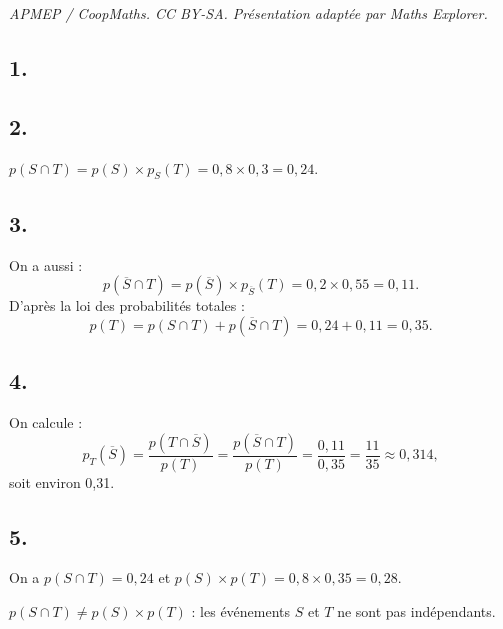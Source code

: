 \documentclass[10pt]{article}
\begin{document}
\noindent\textit{APMEP / CoopMaths. CC BY-SA. Présentation adaptée par Maths Explorer.}\par\medskip
\subsection*{1.}

\begin{center}
\end{center}

\subsection*{2.}

\(p(S \cap T) = p(S) \times p_S(T) = 0{,}8 \times 0{,}3 = 0{,}24\).

\subsection*{3.}

On a aussi :
\[
p(\overline{S} \cap T) = p(\overline{S}) \times p_{\overline{S}}(T) = 0{,}2 \times 0{,}55 = 0{,}11.
\]
D'après la loi des probabilités totales :
\[
p(T) = p(S \cap T) + p(\overline{S} \cap T) = 0{,}24 + 0{,}11 = 0{,}35.
\]

\subsection*{4.}

On calcule :
\[
p_T(\overline{S}) = \frac{p(T \cap \overline{S})}{p(T)} = \frac{p(\overline{S} \cap T)}{p(T)} = \frac{0{,}11}{0{,}35} = \frac{11}{35} \approx 0{,}314,
\]
soit environ 0{,}31.

\subsection*{5.}

On a \(p(S \cap T) = 0{,}24\) et \(p(S) \times p(T) = 0{,}8 \times 0{,}35 = 0{,}28\).

\(p(S \cap T) \neq p(S) \times p(T)\) : les événements \(S\) et \(T\) ne sont pas indépendants.
\end{document}
